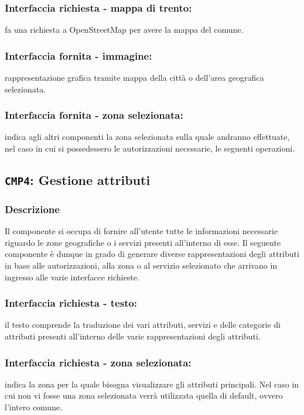         \subsubsection{Interfaccia richiesta - mappa di trento:}
            fa una richiesta a OpenStreetMap per avere la mappa del comune.
        \subsubsection{Interfaccia fornita - immagine:}
            rappresentazione grafica tramite mappa della città o dell'area geografica selezionata.
        \subsubsection{Interfaccia fornita - zona selezionata:}
            indica agli altri componenti la zona selezionata sulla quale andranno effettuate, nel caso in cui si possedessero le autorizzazioni necessarie, le seguenti operazioni.
    
    \subsection{\texttt{CMP4}: Gestione attributi}
        \subsubsection{Descrizione}
            Il componente si occupa di fornire all'utente tutte le informazioni necessarie riguardo le zone geografiche o i servizi presenti all'interno di esse. Il seguente componente è dunque in grado di generare diverse rappresentazioni degli attributi in base alle autorizzazioni, alla zona o al servizio selezionato che arrivano in ingresso alle varie interfacce richieste.
        \subsubsection{Interfaccia richiesta - testo:}
            il testo comprende la traduzione dei vari attributi, servizi e delle categorie di attributi presenti all'interno delle varie rappresentazioni degli attributi.
        \subsubsection{Interfaccia richiesta - zona selezionata:}
            indica la zona per la quale bisogna visualizzare gli attributi principali. Nel caso in cui non vi fosse una zona selezionata verrà utilizzata quella di default, ovvero l'intero comune.
